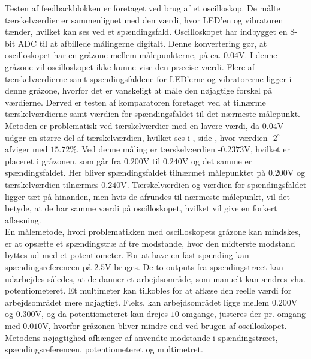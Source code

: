 Testen af feedbackblokken er foretaget ved brug af et oscilloskop. De målte tærskelværdier er sammenlignet med den værdi, hvor LED'en og vibratoren tænder, hvilket kan ses ved et spændingsfald. Oscilloskopet har indbygget en $8$-bit ADC til at afbillede målingerne digitalt. Denne konvertering gør, at oscilloskopet har en gråzone mellem målepunkterne, på ca. $0.04$V. I denne gråzone vil oscilloskopet ikke kunne vise den præcise værdi. Flere af tærskelværdierne samt spændingsfaldene for LED'erne og vibratorerne ligger i denne gråzone, hvorfor det er vanskeligt at måle den nøjagtige forskel på værdierne. Derved er testen af komparatoren foretaget ved at tilnærme tærskelværdierne samt værdien for spændingsfaldet til det nærmeste målepunkt. Metoden er problematisk ved tærskelværdier med en lavere værdi, da $0.04$V udgør en større del af tærskelværdien, hvilket ses i , side \pageref{Tab:test-taendsluk}, hvor værdien -$2^{\circ}$ afviger med $15.72$\%. Ved denne måling er tærskelværdien -$0.2373$V, hvilket er placeret i gråzonen, som går fra $0.200$V til $0.240$V og det samme er spændingsfaldet. Her bliver spændingsfaldet tilnærmet målepunktet på $0.200$V og tærskelværdien tilnærmes $0.240$V. Tærskelværdien og værdien for spændingsfaldet ligger tæt på hinanden, men hvis de afrundes til nærmeste målepunkt, vil det betyde, at de har samme værdi på oscilloskopet, hvilket vil give en forkert aflæsning.  \\
En målemetode, hvori problematikken med oscilloskopets gråzone kan mindskes, er at opsætte et spændingstræ af tre modstande, hvor den midterste modstand byttes ud med et potentiometer. For at have en fast spænding kan spændingsreferencen på $2.5$V bruges. De to outputs fra spændingstræet kan udarbejdes således, at de danner et arbejdsområde, som manuelt kan ændres vha. potentiometeret. Et multimeter kan tilkobles for at aflæse den reelle værdi for arbejdsområdet mere nøjagtigt. F.eks. kan arbejdsområdet ligge mellem $0.200$V og $0.300$V, og da potentiometeret kan drejes $10$ omgange, justeres der pr. omgang med $0.010$V, hvorfor gråzonen bliver mindre end ved brugen af oscilloskopet. Metodens nøjagtighed afhænger af anvendte modstande i spændingstræet, spændingsreferencen, potentiometeret og multimetret. 

